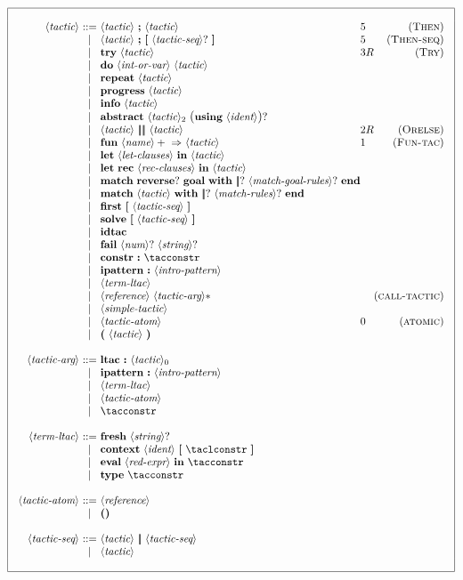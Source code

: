\documentclass{article}
\makeatletter
\def\bfbar{\ensuremath{|\hskip -0.22em{}|\hskip -0.24em{}|}}
\def\TERMbar{\bfbar}
\def\TERMbarbar{\bfbar\bfbar}
\def\GR#1{\text{\large(}#1\text{\large)}}
\def\NT#1{\langle\textit{#1}\rangle}
\def\NTL#1#2{\langle\textit{#1}\rangle_{#2}}
\def\TERM#1{{\bf\textrm{\bf #1}}}
\def\KWD#1{\TERM{#1}}
\def\STAR#1{#1*}
\def\PLUS#1{#1+}
\def\OPT#1{#1?}
\def\OPTGR#1{\GR{#1}?}
\newenvironment{cadre}
        {\begin{array}{|c|}\hline\\}
        {\\\\\hline\end{array}}
\newenvironment{rulebox}
        {$$\begin{cadre}\begin{array}{r@{~}c@{~}l@{}l@{}r}}
        {\end{array}\end{cadre}$$}
\def\DEFNT#1{\NT{#1} & ::= &}
\def\RNAME#1{(\textsc{#1})}
\def\SEPDEF{\\\\}
\def\nlsep{\\&|&}
\newenvironment{rules}
        {\begin{center}\begin{rulebox}}
        {\end{rulebox}\end{center}}
\makeatother
\begin{document}


\begin{rules}
\DEFNT{tactic}
       \NT{tactic} ~\KWD{;} ~\NT{tactic}  &5 &\RNAME{Then}
\nlsep \NT{tactic} ~\KWD{;}~\TERM{[} ~\OPT{\NT{tactic-seq}} ~\TERM{]}
         &5 &\RNAME{Then-seq}
\nlsep \TERM{try} ~\NT{tactic}     &3R &\RNAME{Try}
\nlsep \TERM{do} ~\NT{int-or-var} ~\NT{tactic}
\nlsep \TERM{repeat} ~\NT{tactic}
\nlsep \TERM{progress} ~\NT{tactic}
\nlsep \TERM{info} ~\NT{tactic}
\nlsep \TERM{abstract}~\NTL{tactic}{2}~\OPTGR{\TERM{using}~\NT{ident}}
\nlsep \NT{tactic} ~\TERMbarbar ~\NT{tactic} &2R &\RNAME{Orelse}
\nlsep \KWD{fun} ~\PLUS{\NT{name}} ~\KWD{$\Rightarrow$}
       ~\NT{tactic}  &1 &\RNAME{Fun-tac}
\nlsep \KWD{let} ~\NT{let-clauses} ~\KWD{in} ~\NT{tactic}
\nlsep \KWD{let} ~\TERM{rec} ~\NT{rec-clauses} ~\KWD{in} ~\NT{tactic}
\nlsep \KWD{match}~\OPT{\TERM{reverse}}~\TERM{goal}~\KWD{with}
       ~\OPT{\TERMbar}~\OPT{\NT{match-goal-rules}} ~\KWD{end}
\nlsep \KWD{match} ~\NT{tactic} ~\KWD{with}
       ~\OPT{\TERMbar}~\OPT{\NT{match-rules}} ~\KWD{end}
\nlsep \TERM{first}~\TERM{[} ~\NT{tactic-seq} ~\TERM{]}
\nlsep \TERM{solve}~\TERM{[} ~\NT{tactic-seq} ~\TERM{]}
\nlsep \TERM{idtac}
\nlsep \TERM{fail} ~\OPT{\NT{num}} ~\OPT{\NT{string}}
\nlsep \TERM{constr}~\KWD{:}~\tacconstr
\nlsep \TERM{ipattern}~\KWD{:}~\NT{intro-pattern}
\nlsep \NT{term-ltac}
\nlsep \NT{reference}~\STAR{\NT{tactic-arg}}  &&\RNAME{call-tactic}
\nlsep \NT{simple-tactic}
\nlsep \NT{tactic-atom}  &0 &\RNAME{atomic}
\nlsep \KWD{(} ~\NT{tactic} ~\KWD{)}
\SEPDEF
\DEFNT{tactic-arg}
       \TERM{ltac}~\KWD{:}~\NTL{tactic}{0}
\nlsep \TERM{ipattern}~\KWD{:}~\NT{intro-pattern}
\nlsep \NT{term-ltac}
\nlsep \NT{tactic-atom}
\nlsep \tacconstr
\SEPDEF
\DEFNT{term-ltac}
       \TERM{fresh} ~\OPT{\NT{string}}
\nlsep \TERM{context} ~\NT{ident} ~\TERM{[} ~\taclconstr ~\TERM{]}
\nlsep \TERM{eval} ~\NT{red-expr} ~\KWD{in} ~\tacconstr
\nlsep \TERM{type} ~\tacconstr
\SEPDEF
\DEFNT{tactic-atom}
       \NT{reference}
\nlsep \TERM{()}
\SEPDEF
\DEFNT{tactic-seq}
       \NT{tactic} ~\TERMbar ~\NT{tactic-seq}
\nlsep \NT{tactic}
\end{rules}
\end{document}
